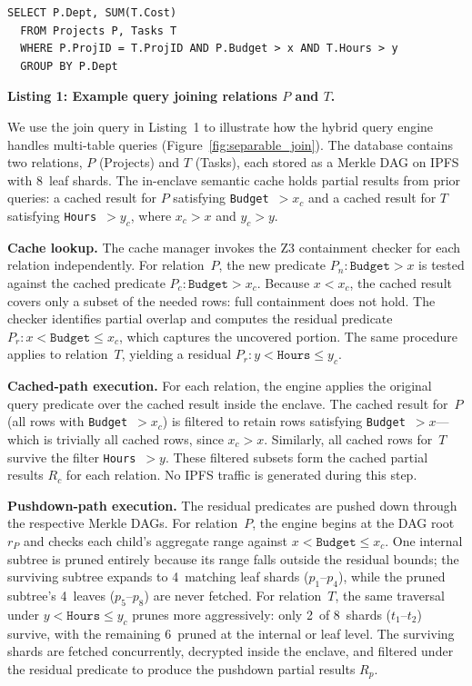\begin{lstlisting}[breaklines=true, basicstyle=\ttfamily\small]
  SELECT P.Dept, SUM(T.Cost)
  FROM Projects P, Tasks T
  WHERE P.ProjID = T.ProjID AND P.Budget > x AND T.Hours > y
  GROUP BY P.Dept
\end{lstlisting}
\textbf{Listing 1: Example query joining relations $P$ and $T$.}

We use the join query in Listing~1 to illustrate how the hybrid query engine handles multi-table queries (Figure~\ref{fig:separable_join}).
The database contains two relations, $P$ (Projects) and $T$ (Tasks), each stored as a Merkle DAG on IPFS with 8~leaf shards.
The in-enclave semantic cache holds partial results from prior queries: a cached result for $P$ satisfying \texttt{Budget}~$> x_c$ and a cached result for $T$ satisfying \texttt{Hours}~$> y_c$, where $x_c > x$ and $y_c > y$.

\textbf{Cache lookup.}
The cache manager invokes the Z3 containment checker for each relation independently.
For relation~$P$, the new predicate $P_n\!: \texttt{Budget} > x$ is tested against the cached predicate $P_c\!: \texttt{Budget} > x_c$.
Because $x < x_c$, the cached result covers only a subset of the needed rows: full containment does not hold.
The checker identifies partial overlap and computes the residual predicate $P_r\!: x < \texttt{Budget} \leq x_c$, which captures the uncovered portion.
The same procedure applies to relation~$T$, yielding a residual $P_r\!: y < \texttt{Hours} \leq y_c$.

\textbf{Cached-path execution.}
For each relation, the engine applies the original query predicate over the cached result inside the enclave.
The cached result for~$P$ (all rows with \texttt{Budget}~$> x_c$) is filtered to retain rows satisfying \texttt{Budget}~$> x$---which is trivially all cached rows, since $x_c > x$.
Similarly, all cached rows for~$T$ survive the filter \texttt{Hours}~$> y$.
These filtered subsets form the cached partial results $R_c$ for each relation.
No IPFS traffic is generated during this step.

\textbf{Pushdown-path execution.}
The residual predicates are pushed down through the respective Merkle DAGs.
For relation~$P$, the engine begins at the DAG root $r_P$ and checks each child's aggregate range against $x < \texttt{Budget} \leq x_c$.
One internal subtree is pruned entirely because its range falls outside the residual bounds; the surviving subtree expands to 4~matching leaf shards ($p_1$--$p_4$), while the pruned subtree's 4~leaves ($p_5$--$p_8$) are never fetched.
For relation~$T$, the same traversal under $y < \texttt{Hours} \leq y_c$ prunes more aggressively: only 2~of 8~shards ($t_1$--$t_2$) survive, with the remaining 6~pruned at the internal or leaf level.
The surviving shards are fetched concurrently, decrypted inside the enclave, and filtered under the residual predicate to produce the pushdown partial results $R_p$.

